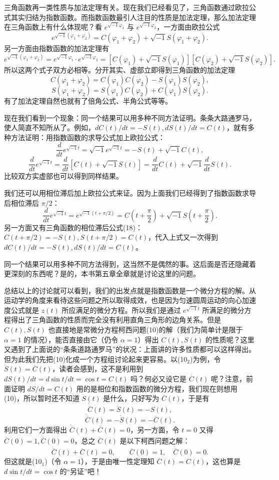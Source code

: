 三角函数再一类性质与加法定理有关。现在我们已经看见了，三角函数通过欧拉公式其实归结为指数函数。而指数函数最引人注目的性质是加法定理，那么加法定理在三角函数上有什么体现呢？看 $e^{\sqrt{-1}\varphi_1}$ 与 $e^{\sqrt{-1}\varphi_2}$，一方面由欧拉公式
\[
e^{\sqrt{-1}(\varphi_1+\varphi_2)}=C(\varphi_1+\varphi_2)+\sqrt{-1}S(\varphi_1+\varphi_2).
\]
另一方面由指数函数的加法定理有
\[
e^{\sqrt{-1}(\varphi_1+\varphi_2)}=e^{\sqrt{-1}\varphi_1}\cdot e^{\sqrt{-1}\varphi_2}
=[C(\varphi_1)+\sqrt{-1}S(\varphi_1)][C(\varphi_2)+\sqrt{-1}S(\varphi_2)].
\]
所以这两个式子双方必相等。分开其实、虚部立即得到三角函数的加法定理
\[
C(\varphi_1+\varphi_2)=C(\varphi_1)C(\varphi_2)-S(\varphi_1)S(\varphi_2), \tag{20$_1$}
\]
\[
S(\varphi_1+\varphi_2)=S(\varphi_1)C(\varphi_2)+C(\varphi_1)S(\varphi_2). \tag{20$_2$}
\]
有了加法定理自然也就有了倍角公式、半角公式等等。

现在我们看到一个现象：同一个结果可以用多种不同方法证明。条条大路通罗马，使人简直不知所从了。例如，$dC(t)/dt=-S(t),dS(t)/dt=C(t)$，就有多种方法证明：用指数函数的求导公式加上欧拉公式：
\[
\frac d{dt}e^{\sqrt{-1}t}=\sqrt{-1}e^{\sqrt{-1}t}=-S(t)+\sqrt{-1}C(t),
\]
\[
\frac d{dt}e^{\sqrt{-1}t}=\frac d{dt}[C(t)+\sqrt{-1}S(t)]
=\frac d{dt}C(t)+\sqrt{-1}\frac d{dt}S(t).
\]
比较双方实虚部也可以得到同样结果。

我们还可以用相位滞后加上欧拉公式来证。因为上面我们已经得到了指数函数求导后相位滞后 $\pi/2$：
\[
\frac d{dt}e^{\sqrt{-1}t}=e^{\sqrt{-1}(t+\pi/2)}
=C\left(t+\frac\pi2\right)+\sqrt{-1}S\left(t+\frac\pi2\right).
\]
另一方面又有三角函数的相位滞后公式(18)：$C(t+\pi/2)=-S(t),S(t+\pi/2)=C(t)$，代入上式又一次得到 $dC(t)/dt=-S(t),dS(t)/dt=C(t)$。

同一个结果可以用多种不同方法得到，这当然不是偶然的事。这后面是否还隐藏着更深刻的东西呢？是的，本书第五章全章就是讨论这里的问题。

总结以上的讨论就可以看到，我们的出发点就是指数函数是一个微分方程的解。从运动学的角度来看待这些问题之所以取得成效，也是因为匀速圆周运动的向心加速度公式就是 $z(t)$ 所应满足的微分方程。所以我们是通过 $e^{\sqrt{-1}t}$ 所满足的微分方程得出了三角函数的性质而完全没有利用直角三角形的边角关系。但是 $C(t),S(t)$ 也直接地是常微分方程柯西问题(10)的解（我们为简单计是限于 $\alpha=1$ 的情况），能否直接由它（仍令 $\alpha=1$）得出 $C(t),S(t)$ 的性质呢？这里又遇到了上面说的“条条道路通罗马”的状况：上面讲的许多性质都可以这样得出。但为此我们先把(10)化成一个方程组讨论起来更容易。以(10$_2$)为例，令 $\dot S(t)=\overline C(t)$，读者会感到，这不是利用到 $dS(t)/dt=d\sin t/dt=\cos t=C(t)$ 吗？何必又设它是 $\overline C(t)$ 呢？注意，前面证明 $dS/dt=C(t)$ 用的是相位和指数函数的微分方程，我们现在则想用(10)，所以暂时还不知道 $\dot S(t)$ 是什么，只好写为 $\overline C(t)$，于是有
\[
\dot{\overline C}(t)=\ddot S(t)=-S(t),
\]
\[
\ddot{\overline C}(t)=-\dot S(t)=-\overline C(t).
\]
利用它们一方面得出 $\ddot{\overline C}(t)+\overline C(t)=0$，另一方面，令 $t=0$ 又得 $\overline C(0)=1,\dot{\overline C}(0)=0$，总之 $\overline C(t)$ 是以下柯西问题之解：
\[
\ddot{\overline C}(t)+\overline C(t)=0,\qquad \overline C(0)=1,\quad \dot{\overline C}(0)=0.
\]
但这就是(10$_1$)（令 $\alpha=1$），于是由唯一性定理知 $\overline C(t)=C(t)$，这也算是 $d\sin t/dt=\cos t$ 的“另证”吧！

